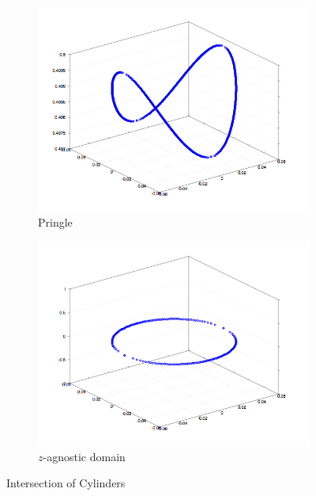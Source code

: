 \documentclass[a4paper,10pt]{article}
\begin{document}
\begin{figure}
  \centering
  \begin{subfigure}{.45\textwidth}
    \centering
      \includegraphics[width=\linewidth]{cylinder_intersection_pringle.png}
    \caption{Pringle}
    \label{fig:1b-a}
  \end{subfigure}
  \begin{subfigure}{.45\textwidth}
    \centering
      \includegraphics[width=\linewidth]{cylinder_intersection_domain.png}
    \caption{\(z\)-agnostic domain}
    \label{fig:1b-b}
  \end{subfigure}
  \caption{Intersection of Cylinders}
  \label{fig:1b}
\end{figure}
\end{document}
